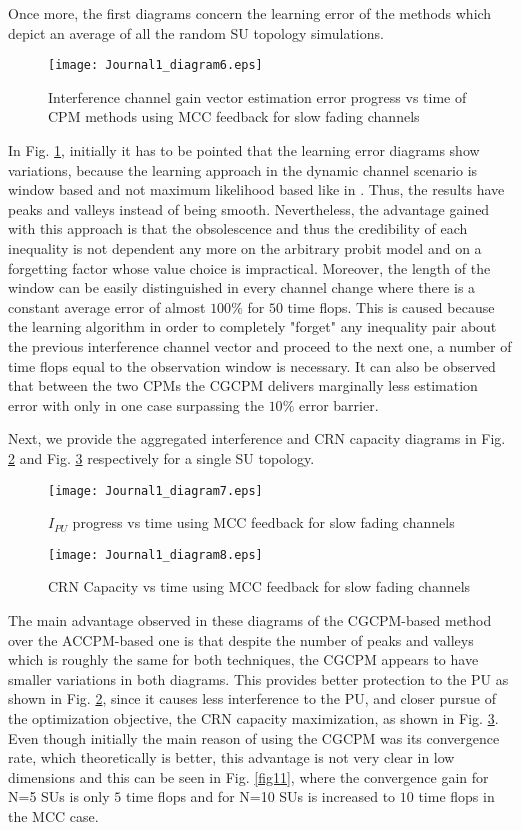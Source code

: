 \documentclass[journal]{IEEEtran}
\begin{document}
Once more, the first diagrams concern the learning error of the methods which depict an average of all the random SU topology simulations.

\begin{figure}[!h]
\centering
\texttt{[image: Journal1\_diagram6.eps]}
\caption{Interference channel gain vector estimation error progress vs time of CPM methods using MCC feedback for slow fading channels}
\label{fig8}
\end{figure}
In Fig. \ref{fig8}, initially it has to be pointed that the learning error diagrams show variations, because the learning approach in the dynamic channel scenario is window based and not maximum likelihood based like in \cite{biban73}. Thus, the results have peaks and valleys instead of being smooth. Nevertheless, the advantage gained with this approach is that the obsolescence and thus the credibility of each inequality is not dependent any more on the arbitrary probit model and on a forgetting factor whose value choice is impractical. Moreover, the length of the window can be easily distinguished in every channel change where there is a constant average error of almost $100\%$ for $50$ time flops. This is caused because the learning algorithm in order to completely "forget" any inequality pair about the previous interference channel vector and proceed to the next one, a number of time flops equal to the observation window is necessary. It can also be observed that between the two CPMs the CGCPM delivers marginally less estimation error with only in one case surpassing the $10\%$ error barrier.   

Next, we provide the aggregated interference and CRN capacity diagrams in Fig. \ref{fig9} and Fig. \ref{fig10} respectively for a single SU topology.

\begin{figure}[!h]
\centering
\texttt{[image: Journal1\_diagram7.eps]}
\caption{$I_{PU}$ progress vs time using MCC feedback for slow fading channels}
\label{fig9}
\end{figure}

\begin{figure}[!h]
\centering
\texttt{[image: Journal1\_diagram8.eps]}
\caption{CRN Capacity vs time using MCC feedback for slow fading channels}
\label{fig10}
\end{figure}
The main advantage observed in these diagrams of the CGCPM-based method over the ACCPM-based one is that despite the number of peaks and valleys which is roughly the same for both techniques, the CGCPM appears to have smaller variations in both diagrams. This provides better protection to the PU as shown in Fig. \ref{fig9}, since it causes less interference to the PU, and closer pursue of the optimization objective, the CRN capacity maximization, as shown in Fig. \ref{fig10}. Even though initially the main reason of using the CGCPM was its convergence rate, which theoretically is better, this advantage is not very clear in low dimensions and this can be seen in Fig. \ref{fig11}, where the convergence gain for N=5 SUs is only $5$ time flops and for N=10 SUs is increased to $10$ time flops in the MCC case.
\end{document}
